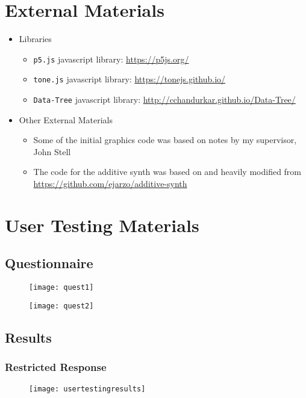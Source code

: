 \chapter{External Materials}
\begin{itemize}
    \item Libraries
    \begin{itemize}
        \item \verb|p5.js| javascript library: \url{https://p5js.org/}
        \item \verb|tone.js| javascript library: \url{https://tonejs.github.io/}
        \item \verb|Data-Tree| javascript library:
            \url{http://cchandurkar.github.io/Data-Tree/}
    \end{itemize}
    \item Other External Materials
    \begin{itemize}
        \item Some of the initial graphics code was based on notes by my
            supervisor, John Stell
        \item The code for the additive synth was based on and heavily modified
            from \url{https://github.com/ejarzo/additive-synth}
    \end{itemize}
\end{itemize}

\chapter{User Testing Materials}
\label{questionnaire}
\section{Questionnaire}
\begin{figure}[H]
    \centering
    \texttt{[image: quest1]}
\end{figure}
\begin{figure}[H]
    \centering
    \texttt{[image: quest2]}
\end{figure}
\section{Results}
\subsection{Restricted Response}
\begin{figure}[H]
    \centering
    \texttt{[image: usertestingresults]}
\end{figure}

